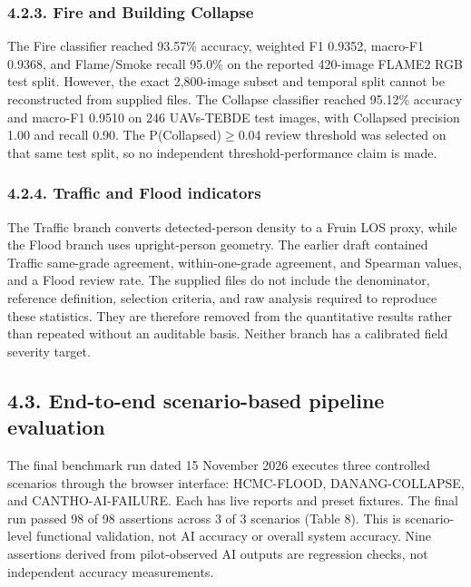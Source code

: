\documentclass[pdflatex,sn-mathphys-ay]{sn-jnl}
\begin{document}
\subsubsection*{4.2.3. Fire and Building Collapse}

The Fire classifier reached 93.57\% accuracy, weighted F1 0.9352, macro-F1 0.9368, and Flame/Smoke recall 95.0\% on the reported 420-image FLAME2 RGB test split. However, the exact 2,800-image subset and temporal split cannot be reconstructed from supplied files. The Collapse classifier reached 95.12\% accuracy and macro-F1 0.9510 on 246 UAVs-TEBDE test images, with Collapsed precision 1.00 and recall 0.90. The P(Collapsed)$\geq$0.04 review threshold was selected on that same test split, so no independent threshold-performance claim is made.

\subsubsection*{4.2.4. Traffic and Flood indicators}

The Traffic branch converts detected-person density to a Fruin LOS proxy, while the Flood branch uses upright-person geometry. The earlier draft contained Traffic same-grade agreement, within-one-grade agreement, and Spearman values, and a Flood review rate. The supplied files do not include the denominator, reference definition, selection criteria, and raw analysis required to reproduce these statistics. They are therefore removed from the quantitative results rather than repeated without an auditable basis. Neither branch has a calibrated field severity target.

\subsection*{4.3. End-to-end scenario-based pipeline evaluation}

The final benchmark run dated 15 November 2026 executes three controlled scenarios through the browser interface: HCMC-FLOOD, DANANG-COLLAPSE, and CANTHO-AI-FAILURE. Each has live reports and preset fixtures. The final run passed 98 of 98 assertions across 3 of 3 scenarios (Table 8). This is scenario-level functional validation, not AI accuracy or overall system accuracy. Nine assertions derived from pilot-observed AI outputs are regression checks, not independent accuracy measurements.
\vspace{8pt}

\end{document}
